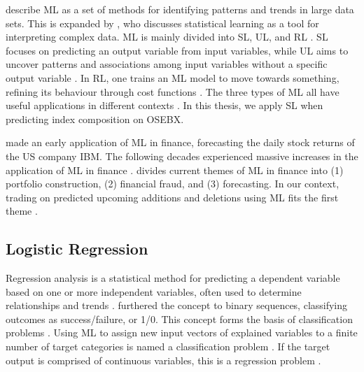 \textcite{ban404-the-elements-of-statistical-learning} describe ML as a set of methods for identifying patterns and trends in large data sets. This is expanded by \textcite{ban404-an-introduction-to-statistical-learning}, who discusses statistical learning as a tool for interpreting complex data. ML is mainly divided into SL, UL, and RL \parencite{ban404-an-introduction-to-statistical-learning}. SL focuses on predicting an output variable from input variables, while UL aims to uncover patterns and associations among input variables without a specific output variable \parencite{ban404-the-elements-of-statistical-learning}. In RL, one trains an ML model to move towards something, refining its behaviour through cost functions \parencite{sutton-reinforcement-learning}. The three types of ML all have useful applications in different contexts \parencite{ban404-the-elements-of-statistical-learning}. In this thesis, we apply SL when predicting index composition on OSEBX.

\textcite{white-ibm-neural-networks} made an early application of ML in finance, forecasting the daily stock returns of the US company IBM. The following decades experienced massive increases in the application of ML in finance \parencite{warin-machine-learning-in-finance-metadata}. \textcite{goodell-artificial-intelligence-and-machine-learning-in-finance} divides current themes of ML in finance into (1) portfolio construction, (2) financial fraud, and (3) forecasting. In our context, trading on predicted upcoming additions and deletions using ML fits the first theme \parencite{goodell-artificial-intelligence-and-machine-learning-in-finance}.  

\subsection{Logistic Regression}

Regression analysis is a statistical method for predicting a dependent variable based on one or more independent variables, often used to determine relationships and trends \parencite{galton-regression}. \textcite{cox-the-regression-analysis-of-binary-sequences} furthered the concept to binary sequences, classifying outcomes as success/failure, or 1/0. This concept forms the basis of classification problems \parencite{cox-the-regression-analysis-of-binary-sequences}. Using ML to assign new input vectors of explained variables to a finite number of target categories is named a classification problem \parencite{bishop-pattern-recognition-and-machine-learning}. If the target output is comprised of continuous variables, this is a regression problem \parencite{bishop-pattern-recognition-and-machine-learning}.  

